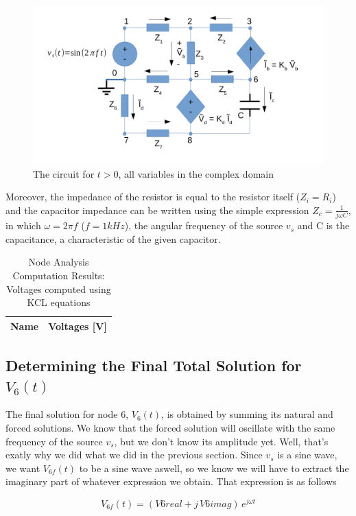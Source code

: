\begin{figure}[h] \centering
\includegraphics[width=0.6\linewidth]{t2-t3456.pdf}
\caption{The circuit for $t>0$, all variables in the complex domain}
\label{fig5}
\end{figure}

Moreover, the impedance of the resistor is equal to the resistor itself ($Z_i = R_i$) and the capacitor impedance can be written using the simple expression $Z_c = \frac{1}{j\omega C}$, in which $\omega = 2\pi f$ ($f =  1kHz$), the angular frequency of the source $v_s$ and C is the capacitance, a characteristic of the given capacitor. 

\begin{table}[h]
  \centering
  \begin{tabular}{|l|r|}
    \hline    
    {\bf Name} & {\bf Voltages [V]} \\ \hline
    
  \end{tabular}
  \caption{Node Analysis Computation Results: Voltages computed using KCL equations}
  \label{tab:nodeVoltages4}
\end{table}




\newpage
\subsection{Determining the Final Total Solution for $V_6(t)$}

The final solution for node 6, $V_6(t)$, is obtained by summing its natural and forced solutions. We know that the forced solution will oscillate with the same frequency of the source $v_s$, but we don't know its amplitude yet. Well, that's exatly why we did what we did in the previous section. Since $v_s$ is a sine wave, we want $V_{6f}(t)$ to be a sine wave aswell, so we know we will have to extract the imaginary part of whatever expression we obtain. That expression is as follows

\begin{center}
  \begin{equation}
    V_{6f}(t) = (V6real + j\,V6imag)\, e^{j\omega t}
  \end{equation} 
\end{center}

